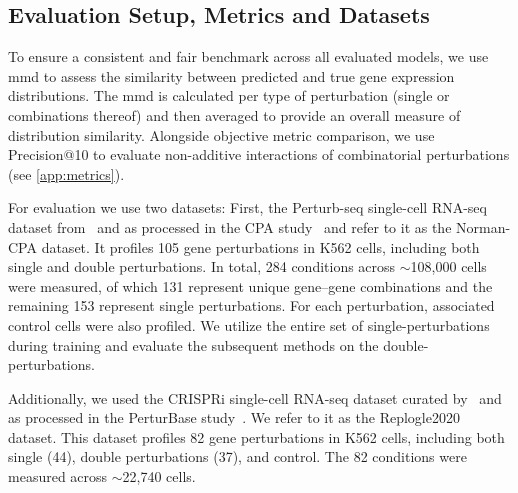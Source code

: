 \subsection{Evaluation Setup, Metrics and Datasets}
\label{subsec:eval_setup_metrics}

To ensure a consistent and fair benchmark across all evaluated  models, we use \gls{mmd} to assess the similarity between predicted and true gene expression distributions.
The \gls{mmd} is calculated per type of perturbation (single or combinations thereof) and then averaged to provide an overall measure of distribution similarity.
Alongside objective metric comparison, we use Precision@10 to evaluate non-additive interactions of combinatorial perturbations (see \cref{app:metrics}).

For evaluation we use two datasets: First, the Perturb-seq single-cell RNA-seq dataset from~\citet{norman2019exploring} and as processed in the CPA study~\citep{lotfollahi2023predicting} and refer to it as the Norman-CPA dataset.
It profiles 105 gene perturbations in K562 cells, including both single and double perturbations.
In total, 284 conditions across $\sim$108,000 cells were measured, of which 131 represent unique gene–gene combinations and the remaining 153 represent single perturbations. For each perturbation, associated control cells were also profiled. 
We utilize the entire set of single-perturbations during training and evaluate the subsequent methods on the double-perturbations.

Additionally, we used the CRISPRi single-cell RNA-seq dataset curated by~\citet{replogle_combinatorial_2020} and as processed in the PerturBase study~\citep{wei_perturbase_2024}. We refer to it as the Replogle2020 dataset.
This dataset profiles 82 gene perturbations in K562 cells, including both single (44), double perturbations (37), and control.
The 82 conditions were measured across $\sim$22,740 cells.